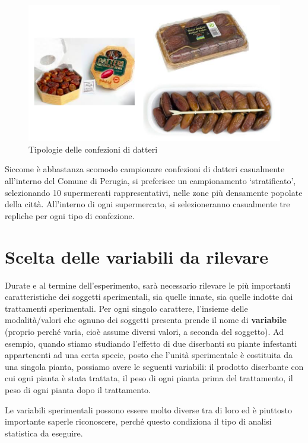 \documentclass[a4paper,12pt,oneside]{book}
\theoremstyle{definition}
\theoremstyle{definition}
\theoremstyle{definition}
\theoremstyle{remark}
\begin{document}
\begin{figure}

{\centering \includegraphics[width=0.9\linewidth]{_images/Datteri} 

}

\caption{Tipologie delle confezioni di datteri}\label{fig:figName32}
\end{figure}

Siccome è abbastanza scomodo campionare confezioni di datteri
casualmente all'interno del Comune di Perugia, si preferisce un
campionamento `stratificato', selezionando 10 supermercati
rappresentativi, nelle zone più densamente popolate della città.
All'interno di ogni supermercato, si selezioneranno casualmente tre
repliche per ogni tipo di confezione.

\section{Scelta delle variabili da
rilevare}\label{scelta-delle-variabili-da-rilevare}

Durate e al termine dell'esperimento, sarà necessario rilevare le più
importanti caratteristiche dei soggetti sperimentali, sia quelle innate,
sia quelle indotte dai trattamenti sperimentali. Per ogni singolo
carattere, l'insieme delle modalità/valori che ognuno dei soggetti
presenta prende il nome di \textbf{variabile} (proprio perché varia,
cioè assume diversi valori, a seconda del soggetto). Ad esempio, quando
stiamo studiando l'effetto di due diserbanti su piante infestanti
appartenenti ad una certa specie, posto che l'unità sperimentale è
costituita da una singola pianta, possiamo avere le seguenti variabili:
il prodotto diserbante con cui ogni pianta è stata trattata, il peso di
ogni pianta prima del trattamento, il peso di ogni pianta dopo il
trattamento.

Le variabili sperimentali possono essere molto diverse tra di loro ed è
piuttosto importante saperle riconoscere, perché questo condiziona il
tipo di analisi statistica da eseguire.
\end{document}
